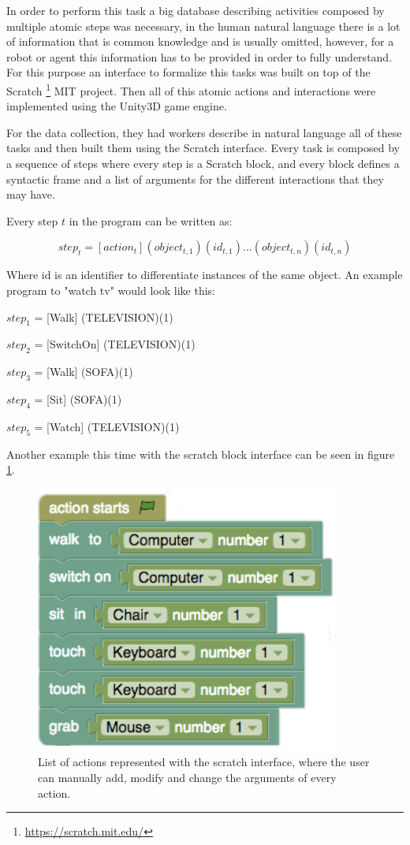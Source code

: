 In order to perform this task a big database describing activities composed by multiple atomic steps was necessary, in the human natural language there is a lot of information that is common knowledge and is usually omitted, however, for a robot or agent this information has to be provided in order to fully understand. For this purpose an interface to formalize this tasks was built on top of the Scratch \footnote{\url{https://scratch.mit.edu/}} MIT project. Then all of this atomic actions and interactions were implemented using the Unity3D game engine.

For the data collection, they had workers describe in natural language all of these tasks and then built them using the Scratch interface. Every task is composed by a sequence of steps where every step is a Scratch block, and every block defines a syntactic frame and a list of arguments for the different interactions that they may have.

Every step $t$ in the program can be written as:

\[ step_t = [action_t] (object_{t,1})(id_{t,1}) ... (object_{t,n})(id_{t,n}) \]

Where id is an identifier to differentiate instances of the same object. An example program to "watch tv" would look like this: 
\newline

$step_1$ = [Walk] (TELEVISION)(1)

$step_2$ = [SwitchOn] (TELEVISION)(1)

$step_3$ = [Walk] (SOFA)(1)

$step_4$ = [Sit] (SOFA)(1)

$step_5$ = [Watch] (TELEVISION)(1) \newline

Another example this time with the scratch block interface can be seen in figure \ref{fig:virtualhome_example}.

\begin{figure}[h]
	\includegraphics[scale=0.5]{archivos/virtualhome_example.png}
	\centering
	\caption{List of actions represented with the scratch interface, where the user can manually add, modify and change the arguments of every action.}
	\label{fig:virtualhome_example}
\end{figure}

